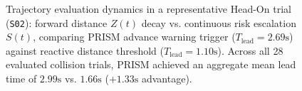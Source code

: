 \begin{figure}[t]
\caption{Trajectory evaluation dynamics in a representative Head-On trial (\texttt{S02}): forward distance $Z(t)$ decay vs. continuous risk escalation $S(t)$, comparing PRISM advance warning trigger ($T_{\text{lead}} = 2.69\text{s}$) against reactive distance threshold ($T_{\text{lead}} = 1.10\text{s}$). Across all 28 evaluated collision trials, PRISM achieved an aggregate mean lead time of $2.99\text{s}$ vs. $1.66\text{s}$ ($+1.33\text{s}$ advantage).}
\label{fig:results_curves}
\end{figure}
